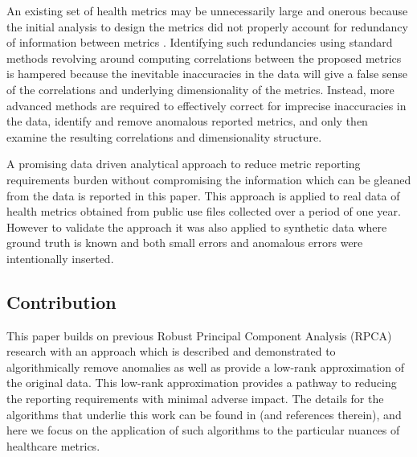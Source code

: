 \documentclass[conference]{IEEEtran}
\begin{document}
An existing set of health metrics may be unnecessarily large and onerous because the initial analysis to design the metrics did not properly account for redundancy of information between metrics \cite{lesidea1, vostok2013assessment}.
Identifying such redundancies using standard methods revolving around computing correlations between the proposed metrics is hampered because the inevitable inaccuracies in the data will give a false sense of the correlations and underlying dimensionality of the metrics.   Instead, more advanced methods are required to effectively correct for imprecise inaccuracies in the data, identify and remove anomalous reported metrics, and only then examine the resulting correlations and dimensionality structure.

A promising data driven analytical approach to reduce metric reporting requirements burden without compromising the information which can be gleaned from the data is reported in this paper. This approach is applied to real data of  health metrics obtained from public use files collected over a period of one year.  However to validate the approach it was also applied to synthetic data where ground truth is known and both small errors and anomalous errors were intentionally inserted.


\subsection{Contribution}
This paper builds on previous Robust Principal Component Analysis (RPCA) research with an approach which is described and demonstrated to algorithmically remove anomalies as well as provide a low-rank approximation of the original data.  This low-rank approximation provides a pathway to reducing the reporting requirements with minimal adverse impact.  The details for the algorithms that underlie this work can be found in \cite{paffenroth2018robust,Paffenroth2012} (and references therein), and here we focus on the application of such algorithms to the particular nuances of healthcare metrics. 
\end{document}
